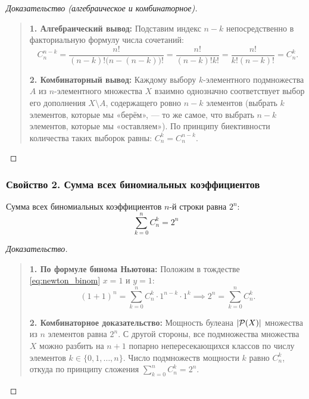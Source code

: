 \begin{proof}[Доказательство (алгебраическое и комбинаторное)]~\\
    \begin{quote}
        \textbf{1. Алгебраический вывод:} 
        Подставим индекс $n - k$ непосредственно в факториальную формулу 
        числа сочетаний:
        \[
            C_n^{n-k} = \frac{n!}{(n - k)!\bigl(n - (n - k)\bigr)!} = 
            \frac{n!}{(n - k)! k!} = \frac{n!}{k!(n - k)!} = C_n^k.
        \]

        \textbf{2. Комбинаторный вывод:} 
        Каждому выбору $k$-элементного подмножества $A$ из $n$-элементного 
        множества $X$ взаимно однозначно соответствует выбор его дополнения 
        $X \setminus A$, содержащего ровно $n - k$ элементов (выбрать $k$ 
        элементов, которые мы «берём», --- то же самое, что выбрать $n - k$ 
        элементов, которые мы «оставляем»). По принципу биективности 
        количества таких выборок равны: $C_n^k = C_n^{n-k}$.
    \end{quote}
\end{proof}

\subsubsection{Свойство 2. Сумма всех биномиальных коэффициентов}

\begin{proposition}
    Сумма всех биномиальных коэффициентов $n$-й строки равна $2^n$:
    \begin{equation} \label{eq:binom_sum_all}
        \sum_{k=0}^{n} C_n^k = 2^n \tag{3}
    \end{equation}
\end{proposition}

\begin{proof}[Доказательство]~\\
    \begin{quote}
        \textbf{1. По формуле бинома Ньютона:} 
        Положим в тождестве \eqref{eq:newton_binom} $x = 1$ и $y = 1$:
        \[
            (1 + 1)^n = \sum_{k=0}^{n} C_n^k \cdot 1^{n-k} \cdot 1^k \implies 
            2^n = \sum_{k=0}^{n} C_n^k.
        \]

        \textbf{2. Комбинаторное доказательство:} 
        Мощность булеана $\left| \mathcal{P}(X) \right|$ множества из $n$ элементов 
        равна $2^n$. С другой стороны, все подмножества множества $X$ можно 
        разбить на $n + 1$ попарно непересекающихся классов по числу 
        элементов $k \in \{0, 1, \dots, n\}$. Число подмножеств мощности 
        $k$ равно $C_n^k$, откуда по принципу сложения $\sum_{k=0}^n C_n^k = 2^n$.
    \end{quote}
\end{proof}

